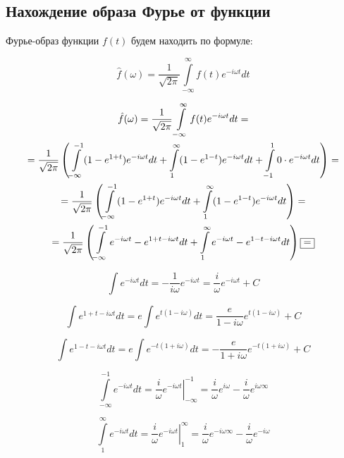 \documentclass[a5paper, 10pt]{article}
\theoremstyle{definition}
\theoremstyle{plain}
\theoremstyle{remark}
\begin{document}
\subsection{Нахождение образа Фурье от функции}

Фурье-образ функции $f(t)$ будем находить по формуле:

\begin{equation}
\hat{f} (\omega) = \frac{1}{\sqrt{2 \pi}} \int \limits_{-\infty}^{\infty} f(t) e^{-i \omega t} dt
\end{equation}

\begin{multline}
\hat{f} (\omega) = \frac{1}{\sqrt{2 \pi}} \int \limits_{-\infty}^{\infty} f(t) e^{-i \omega t} dt =\\= \frac{1}{\sqrt{2 \pi}} \left( \int \limits_{-\infty}^{-1} (1 - e^{1 + t}) e^{-i \omega t} dt + \int \limits_{1}^{\infty} (1 - e^{1 - t}) e^{-i \omega t} dt + \int \limits_{-1}^{1} 0 \cdot e^{-i \omega t} dt \right) =\\=
\frac{1}{\sqrt{2 \pi}} \left( \int \limits_{-\infty}^{-1} (1 - e^{1 + t}) e^{-i \omega t} dt + \int \limits_{1}^{\infty} (1 - e^{1 - t}) e^{-i \omega t} dt \right) = \\ = \frac{1}{\sqrt{2 \pi}} \left( \int \limits_{-\infty}^{-1}  e^{-i \omega t} - e^{1 + t -i \omega t} dt + \int \limits_{1}^{\infty}  e^{-i \omega t} - e^{1 - t -i \omega t} dt \right) \fbox{=}
\end{multline}

\begin{equation}
\int e^{-i \omega t} dt = -\frac{1}{i \omega} e^{-i \omega t} = \frac{i}{\omega} e^{-i \omega t}  + C
\end{equation}

\begin{equation}
\int e^{1 + t -i \omega t} dt = e \int e^{ t (1 -i \omega)} dt = \frac{e}{1 - i \omega}  e^{ t (1 -i \omega)} + C
\end{equation}



\begin{equation}
\int e^{1 - t -i \omega t} dt = e \int e^{- t (1 + i \omega)} dt = -\frac{e}{1 + i \omega}  e^{- t (1 +i \omega)} + C
\end{equation}


\begin{equation}
\int \limits_{-\infty}^{-1}  e^{-i \omega t} dt  = \left. \frac{i}{\omega} e^{-i \omega t} \right|_{-\infty}^{-1} = \frac{i}{\omega} e^{i \omega} - \frac{i}{\omega} e^{i \omega \infty}
\end{equation}


\begin{equation}
\int \limits_{1}^{\infty}  e^{-i \omega t} dt  = \left. \frac{i}{\omega} e^{-i \omega t} \right|_{1}^{\infty} = \frac{i}{\omega} e^{-i \omega \infty} - \frac{i}{\omega} e^{-i \omega }
\end{equation}
\end{document}
